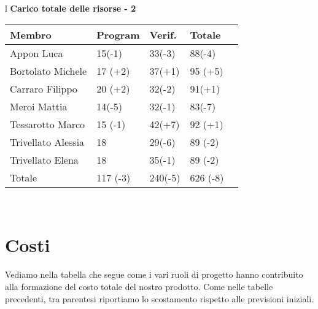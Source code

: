 \begin{table}[hbtp]
\large{
\begin{tabular}{l}
\Large{\textbf{\textsf{Carico totale delle risorse - 2}}} \\

\begin{tabular}{||p{3.5cm}||p{2cm}||p{2cm}||p{2cm}||p{2cm}||}
\hline
\textbf{Membro} & \textbf{Program} & \textbf{Verif.} & \textbf{Totale}\\
\hline
{Appon Luca}&15\footnotesize{(-1)}&33\footnotesize{(-3)}&88\footnotesize{(-4)} \\ 
\hline 
{Bortolato Michele} &17 \footnotesize{(+2)}&37\footnotesize{(+1)}&95 \footnotesize{(+5)}\\ 
\hline
{Carraro Filippo}&20 \footnotesize{(+2)}&32\footnotesize{(-2)}&91\footnotesize{(+1)} \\
\hline
{Meroi Mattia}&14\footnotesize{(-5)}&32\footnotesize{(-1)}&83\footnotesize{(-7)}\\
\hline
{Tessarotto Marco} &15 \footnotesize{(-1)}&42\footnotesize{(+7)}&92 \footnotesize{(+1)}\\
\hline
{Trivellato Alessia} &18&29\footnotesize{(-6)}&89 \footnotesize{(-2)} \\
\hline
{Trivellato Elena} &18&35\footnotesize{(-1)}&89 \footnotesize{(-2)} \\
\hline
{Totale} &117 \footnotesize{(-3)}&240\footnotesize{(-5)}&626 \footnotesize{(-8)} \\
\hline

\end{tabular} \\
\end{tabular}
}
\end{table}

\chapter{Costi}
Vediamo nella tabella che segue come i vari ruoli di progetto hanno contribuito alla formazione del costo totale del nostro prodotto. Come nelle tabelle precedenti, tra parentesi riportiamo lo scostamento rispetto alle previsioni iniziali.\\

